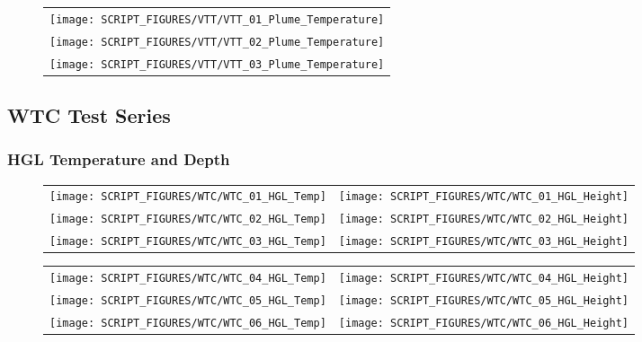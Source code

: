 \begin{figure}[!ht]
\begin{center}
\begin{tabular}{c}
\texttt{[image: SCRIPT\_FIGURES/VTT/VTT\_01\_Plume\_Temperature]} \\
\texttt{[image: SCRIPT\_FIGURES/VTT/VTT\_02\_Plume\_Temperature]} \\
\texttt{[image: SCRIPT\_FIGURES/VTT/VTT\_03\_Plume\_Temperature]}
\end{tabular}
\end{center}
\label{VTT_Plume}
\end{figure}

\clearpage

\subsection{WTC Test Series}

\subsubsection{HGL Temperature and Depth}

\begin{figure}[!ht]
\begin{tabular*}{\textwidth}{l@{\extracolsep{\fill}}r}
\texttt{[image: SCRIPT\_FIGURES/WTC/WTC\_01\_HGL\_Temp]} &
\texttt{[image: SCRIPT\_FIGURES/WTC/WTC\_01\_HGL\_Height]} \\
\texttt{[image: SCRIPT\_FIGURES/WTC/WTC\_02\_HGL\_Temp]} &
\texttt{[image: SCRIPT\_FIGURES/WTC/WTC\_02\_HGL\_Height]} \\
\texttt{[image: SCRIPT\_FIGURES/WTC/WTC\_03\_HGL\_Temp]} &
\texttt{[image: SCRIPT\_FIGURES/WTC/WTC\_03\_HGL\_Height]}
\end{tabular*}
\end{figure}

\newpage

\begin{figure}[!ht]
\begin{tabular*}{\textwidth}{l@{\extracolsep{\fill}}r}
\texttt{[image: SCRIPT\_FIGURES/WTC/WTC\_04\_HGL\_Temp]} &
\texttt{[image: SCRIPT\_FIGURES/WTC/WTC\_04\_HGL\_Height]} \\
\texttt{[image: SCRIPT\_FIGURES/WTC/WTC\_05\_HGL\_Temp]} &
\texttt{[image: SCRIPT\_FIGURES/WTC/WTC\_05\_HGL\_Height]} \\
\texttt{[image: SCRIPT\_FIGURES/WTC/WTC\_06\_HGL\_Temp]} &
\texttt{[image: SCRIPT\_FIGURES/WTC/WTC\_06\_HGL\_Height]}
\end{tabular*}
\end{figure}

